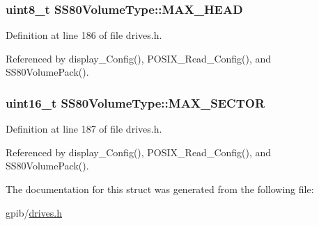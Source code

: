 \subsubsection[{\texorpdfstring{M\+A\+X\+\_\+\+H\+E\+AD}{MAX_HEAD}}]{\setlength{\rightskip}{0pt plus 5cm}uint8\+\_\+t S\+S80\+Volume\+Type\+::\+M\+A\+X\+\_\+\+H\+E\+AD}\hypertarget{structSS80VolumeType_acc2870eb0a52a0e7f4dc57f036d903b1}{}\label{structSS80VolumeType_acc2870eb0a52a0e7f4dc57f036d903b1}


Definition at line 186 of file drives.\+h.



Referenced by display\+\_\+\+Config(), P\+O\+S\+I\+X\+\_\+\+Read\+\_\+\+Config(), and S\+S80\+Volume\+Pack().

\subsubsection[{\texorpdfstring{M\+A\+X\+\_\+\+S\+E\+C\+T\+OR}{MAX_SECTOR}}]{\setlength{\rightskip}{0pt plus 5cm}uint16\+\_\+t S\+S80\+Volume\+Type\+::\+M\+A\+X\+\_\+\+S\+E\+C\+T\+OR}\hypertarget{structSS80VolumeType_a0a367b3bf05801cdee9dadc8324a3bdb}{}\label{structSS80VolumeType_a0a367b3bf05801cdee9dadc8324a3bdb}


Definition at line 187 of file drives.\+h.



Referenced by display\+\_\+\+Config(), P\+O\+S\+I\+X\+\_\+\+Read\+\_\+\+Config(), and S\+S80\+Volume\+Pack().



The documentation for this struct was generated from the following file\+:\begin{DoxyCompactItemize}
\item 
gpib/\hyperlink{drives_8h}{drives.\+h}\end{DoxyCompactItemize}
